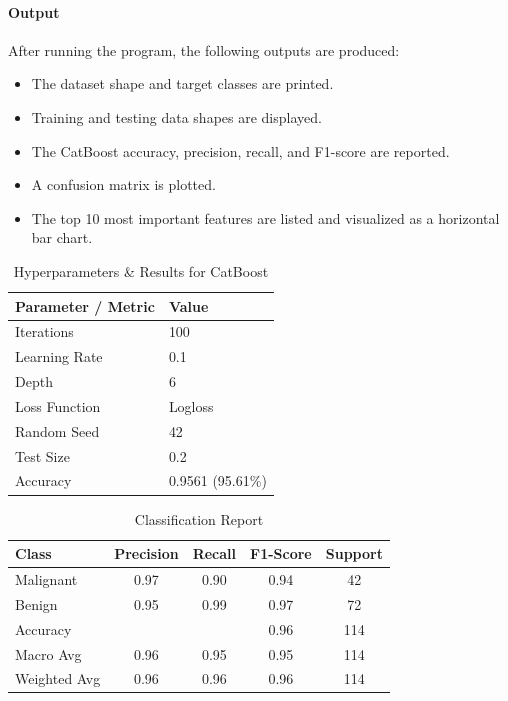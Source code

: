 \documentclass[a4paper,11pt]{article}
\begin{document}
\begin{itemize}
\paragraph{Output}
After running the program, the following outputs are produced:
\begin{itemize}
    \item The dataset shape and target classes are printed.
    \item Training and testing data shapes are displayed.
    \item The CatBoost accuracy, precision, recall, and F1-score are reported.
    \item A confusion matrix is plotted.
    \item The top 10 most important features are listed and visualized as a horizontal bar chart.
\end{itemize}

\begin{table}[H]
\centering
\caption{Hyperparameters \& Results for CatBoost}
\begin{tabular}{ll}
\toprule
\textbf{Parameter / Metric} & \textbf{Value} \\
\midrule
Iterations          & 100 \\
Learning Rate       & 0.1 \\
Depth               & 6 \\
Loss Function       & Logloss \\
Random Seed         & 42 \\
Test Size           & 0.2 \\
Accuracy            & 0.9561 (95.61\%) \\
\bottomrule
\end{tabular}
\end{table}

\begin{table}[H]
\centering
\caption{Classification Report}
\begin{tabular}{lcccc}
\toprule
\textbf{Class} & \textbf{Precision} & \textbf{Recall} & \textbf{F1-Score} & \textbf{Support} \\
\midrule
Malignant      & 0.97 & 0.90 & 0.94 & 42 \\
Benign         & 0.95 & 0.99 & 0.97 & 72 \\
\midrule
Accuracy       &      &      & 0.96 & 114 \\
Macro Avg      & 0.96 & 0.95 & 0.95 & 114 \\
Weighted Avg   & 0.96 & 0.96 & 0.96 & 114 \\
\bottomrule
\end{tabular}
\end{table}


\end{itemize}
\end{document}

